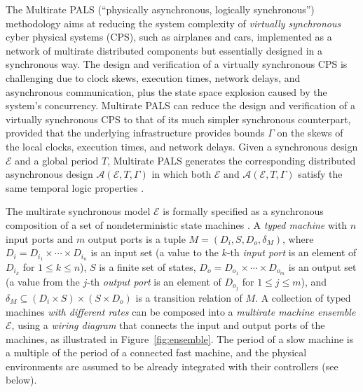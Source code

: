 \documentclass{sig-alternate}
\begin{document}
The Multirate PALS (``physically asynchronous,  logically synchronous'') 
methodology \cite{pals-rtss09,mr-pals-journal,pals-tcs}
aims at reducing the system complexity 
of \emph{virtually synchronous}  cyber physical systems (CPS),
such as airplanes and cars,
implemented as a network of multirate distributed components but essentially designed in a synchronous way.
%
The design and verification of a virtually synchronous CPS
is challenging  due to
clock skews,
execution times, 
network delays, and asynchronous communication,
plus the state space explosion caused by the system's concurrency. 
%
Multirate PALS can reduce
the design and verification of a virtually synchronous CPS to
that of its much simpler synchronous counterpart,
provided that the underlying infrastructure provides bounds $\Gamma$
on the skews of the local clocks, 
execution times,  and network delays. 
%
Given a synchronous design $\mathcal{E}$ and a global period $T$,
Multirate PALS generates
the corresponding distributed asynchronous 
design $\mathcal{A}(\mathcal{E}, T, \Gamma)$
in which both $\mathcal{E}$ and $\mathcal{A}(\mathcal{E}, T, \Gamma)$
satisfy the same temporal logic properties \cite{mr-pals-journal,pals-tcs}.
%



The multirate synchronous model $\mathcal{E}$ 
is formally specified as
a synchronous composition of a set of  nondeterministic state machines \cite{pals-tcs}.
%
A \emph{typed machine} with $n$ input ports and $m$ output ports
is a tuple $M = (D_i,S,D_o,\delta_M)$,
where
$D_i = D_{i_1} \times \cdots \times D_{i_n}$ is an input set 
(a value to the $k$-th \emph{input port}  is an element of $D_{i_k}$ for $1 \leq k \leq n$), %
$S$ is a finite set of states,
$D_o =D_{o_1} \times \cdots \times D_{o_m}$ is an output set
(a value from the $j$-th \emph{output port} is an element of $D_{o_j}$ for $1 \leq j \leq m$), %
and
$\delta_M \subseteq (D_i \times S) \times (S \times D_o)$ is a %
transition relation of $M$.
A collection of typed machines \emph{with different rates}
can be composed into a \emph{multirate machine ensemble} $\mathcal{E}$,
using  a \emph{wiring diagram} that connects  the input and output ports of the machines,
as illustrated in Figure~\ref{fig:ensemble}.
The period of a slow machine is a multiple of the period of a connected fast machine,
and the physical environments are 
assumed to be already integrated with their controllers (see below).
\end{document}
